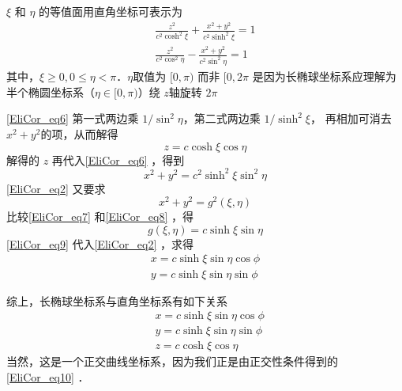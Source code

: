 $\xi$ 和 $\eta$ 的等值面用直角坐标可表示为
\begin{equation}\label{EliCor_eq6}
\begin{aligned}
\frac{z^2}{c^2\cosh^2\xi}+\frac{x^2+y^2}{c^2\sinh^2\xi}=1\\
\frac{z^2}{c^2\cos^2\eta}-\frac{x^2+y^2}{c^2\sin^2\eta}=1
\end{aligned}
\end{equation}
其中，$\xi\geq 0,0\leq\eta<\pi$．$\eta$取值为 $[0,\pi)$ 而非 $[0,2\pi$ 是因为长椭球坐标系应理解为半个椭圆坐标系（$\eta\in[0,\pi)$）绕 $z$轴旋转 $2\pi$ 

\autoref{EliCor_eq6} 第一式两边乘 $1/\sin^2\eta$，第二式两边乘 $1/\sinh^2\xi$， 再相加可消去$x^2+y^2$的项，从而解得
\begin{equation}
z=c\cosh\xi\cos\eta
\end{equation}
 解得的 $z$ 再代入\autoref{EliCor_eq6} ，得到
 \begin{equation}\label{EliCor_eq7}
 x^2+y^2=c^2\sinh^2\xi\sin^2\eta
 \end{equation}
 \autoref{EliCor_eq2} 又要求
 \begin{equation}\label{EliCor_eq8}
 x^2+y^2=g^2(\xi,\eta)
 \end{equation}
 比较\autoref{EliCor_eq7} 和\autoref{EliCor_eq8} ，得
 \begin{equation}\label{EliCor_eq9}
 g(\xi,\eta)=c\sinh\xi\sin\eta
 \end{equation}
 \autoref{EliCor_eq9} 代入\autoref{EliCor_eq2} ，求得
 \begin{equation}
 \begin{aligned}
 x=c\sinh\xi\sin\eta\cos\phi\\
y=c\sinh\xi\sin\eta\sin\phi
 \end{aligned}
 \end{equation}
 
 综上，长椭球坐标系与直角坐标系有如下关系
 \begin{equation}\label{EliCor_eq10}
 \begin{aligned}
 &x=c\sinh\xi\sin\eta\cos\phi\\
&y=c\sinh\xi\sin\eta\sin\phi\\
&z=c\cosh\xi\cos\eta
 \end{aligned}
 \end{equation}
 当然，这是一个正交曲线坐标系，因为我们正是由正交性条件得到的\autoref{EliCor_eq10} ．



